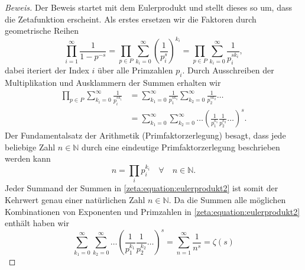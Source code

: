 \begin{proof}[Beweis]
    Der Beweis startet mit dem Eulerprodukt und stellt dieses so um, dass die Zetafunktion erscheint.
    Als erstes ersetzen wir die Faktoren durch geometrische Reihen
    \begin{equation}
        \prod_{i=1}^{\infty}
        \frac{1}{1-p^{-s}}
        =
        \prod_{p \in P}
        \sum_{k_i=0}^{\infty}
        \left(
        \frac{1}{p_i^s}
        \right)^{k_i}
        =
        \prod_{p \in P}
        \sum_{k_i=0}^{\infty}
        \frac{1}{p_i^{s k_i}},
    \end{equation}
    dabei iteriert der Index $i$ über alle Primzahlen $p_i$.
    Durch Ausschreiben der Multiplikation und Ausklammern der Summen erhalten wir
    \begin{align}
        \prod_{p \in P}
        \sum_{k_i=0}^{\infty}
        \frac{1}{p_i^{s k_i}}
        &=
        \sum_{k_1=0}^{\infty}
        \frac{1}{p_1^{s k_1}}
        \sum_{k_2=0}^{\infty}
        \frac{1}{p_2^{s k_2}}
        \ldots
        \nonumber \\
        &=
        \sum_{k_1=0}^{\infty}
        \sum_{k_2=0}^{\infty}
        \ldots
        \left(
        \frac{1}{p_1^{k_1}}
        \frac{1}{p_2^{k_2}}
        \ldots
        \right)^s.
        \label{zeta:equation:eulerprodukt2}
    \end{align}
    Der Fundamentalsatz der Arithmetik (Primfaktorzerlegung) besagt, dass jede beliebige Zahl $n \in \mathbb{N}$ durch eine eindeutige Primfaktorzerlegung beschrieben werden kann
    \begin{equation}
        n = \prod_i p_i^{k_i} \quad \forall \quad n \in \mathbb{N}.
    \end{equation}
    Jeder Summand der Summen in \eqref{zeta:equation:eulerprodukt2} ist somit der Kehrwert genau einer natürlichen Zahl $n \in \mathbb{N}$.
    Da die Summen alle möglichen Kombinationen von Exponenten und Primzahlen in \eqref{zeta:equation:eulerprodukt2} enthält haben wir
    \begin{equation}
        \sum_{k_1=0}^{\infty}
        \sum_{k_2=0}^{\infty}
        \ldots
        \left(
        \frac{1}{p_1^{k_1}}
        \frac{1}{p_2^{k_2}}
        \ldots
        \right)^s
        =
        \sum_{n=1}^\infty
        \frac{1}{n^s}
        =
        \zeta(s)
    \end{equation}
\end{proof}

